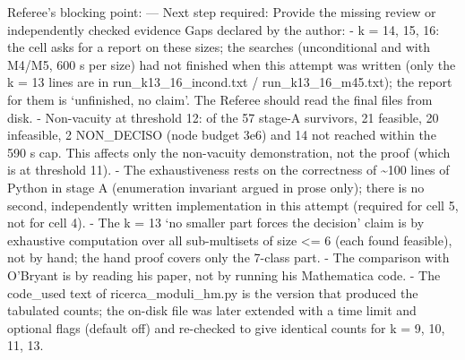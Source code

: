 Referee's blocking point: --- Next step required: Provide the missing
review or independently checked evidence Gaps declared by the author: -
k = 14, 15, 16: the cell asks for a report on these sizes; the searches
(unconditional and with M4/M5, 600 s per size) had not finished when
this attempt was written (only the k = 13 lines are in
run\_k13\_16\_incond.txt / run\_k13\_16\_m45.txt); the report for them
is `unfinished, no claim'. The Referee should read the final files from
disk. - Non-vacuity at threshold 12: of the 57 stage-A survivors, 21
feasible, 20 infeasible, 2 NON\_DECISO (node budget 3e6) and 14 not
reached within the 590 s cap. This affects only the non-vacuity
demonstration, not the proof (which is at threshold 11). - The
exhaustiveness rests on the correctness of \textasciitilde100 lines of
Python in stage A (enumeration invariant argued in prose only); there is
no second, independently written implementation in this attempt
(required for cell 5, not for cell 4). - The k = 13 `no smaller part
forces the decision' claim is by exhaustive computation over all
sub-multisets of size \textless= 6 (each found feasible), not by hand;
the hand proof covers only the 7-class part. - The comparison with
O'Bryant is by reading his paper, not by running his Mathematica code. -
The code\_used text of ricerca\_moduli\_hm.py is the version that
produced the tabulated counts; the on-disk file was later extended with
a time limit and optional flags (default off) and re-checked to give
identical counts for k = 9, 10, 11, 13.

